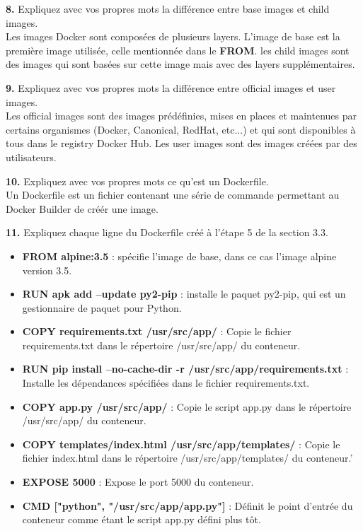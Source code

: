 \documentclass[12pt, letterpaper]{report}
\begin{document}
\textbf{8.} Expliquez avec vos propres mots la différence entre base images et child images.\\
Les images Docker sont composées de plusieurs layers. L'image de base est la première image utilisée, celle mentionnée dans le \textbf{FROM}. les child images sont des images qui sont basées sur cette image mais avec des layers supplémentaires. 
\newline

\textbf{9.} Expliquez avec vos propres mots la différence entre official images et user images.\\
Les official images sont des images prédéfinies, mises en places et maintenues par certains organismes (Docker, Canonical, RedHat, etc...) et qui sont disponibles à tous dans le registry Docker Hub. Les user images sont des images créées par des utilisateurs. 
\newline

\textbf{10.} Expliquez avec vos propres mots ce qu'est un Dockerfile.\\
Un Dockerfile est un fichier contenant une série de commande permettant au Docker Builder de créér une image. 
\newline

\textbf{11.} Expliquez chaque ligne du Dockerfile créé à l'étape 5 de la section 3.3.\\
\begin{itemize}
	\item \textbf{FROM alpine:3.5} : spécifie l'image de base, dans ce cas l'image alpine version 3.5. \\
	\item \textbf{RUN apk add --update py2-pip} : installe le paquet py2-pip, qui est un gestionnaire de paquet pour Python. \\
	\item \textbf{COPY requirements.txt /usr/src/app/} : Copie le fichier requirements.txt dans le répertoire /usr/src/app/ du conteneur. \\
	\item \textbf{RUN pip install --no-cache-dir -r /usr/src/app/requirements.txt} : Installe les dépendances spécifiées dans le fichier requirements.txt. \\
	\item \textbf{COPY app.py /usr/src/app/} : Copie le script app.py dans le répertoire /usr/src/app/ du conteneur. \\
	\item \textbf{COPY templates/index.html /usr/src/app/templates/} : Copie le fichier index.html dans le répertoire /usr/src/app/templates/ du conteneur.' \\
	\item \textbf{EXPOSE 5000} : Expose le port 5000 du conteneur. \\
	\item \textbf{CMD ["python", "/usr/src/app/app.py"]} : Définit le point d'entrée du conteneur comme étant le script app.py défini plus tôt.  \\
\end{itemize}
\end{document}
